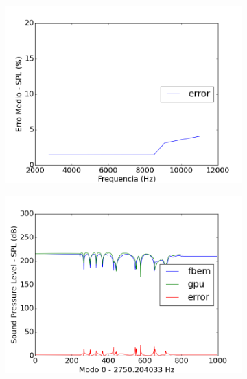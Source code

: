 \begin{figure}[ht]
\centering
\begin{subfigure}{0.6\textwidth}
	\centering
	\includegraphics[width=\textwidth]{../data/transfer_test/steel_key/plots/steel_key_error.png}
	\caption{}
	\label{fig:coef_key_err}
\end{subfigure}
\begin{subfigure}{0.45\textwidth}
	\centering
	\includegraphics[width=\textwidth]{../data/transfer_test/steel_key/plots/steel_key-tfv-0_0.png}
	\caption{}
	\label{fig:coef_key_0}
\end{subfigure}%
\begin{subfigure}{0.45\textwidth}
	\centering

\end{subfigure}
\end{figure}
